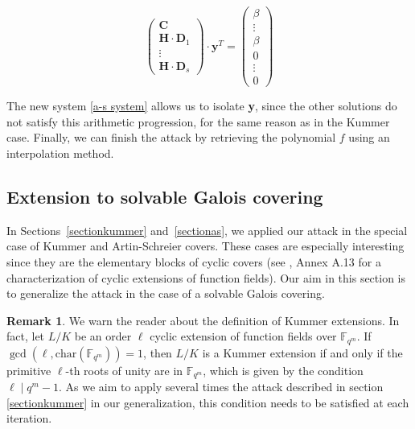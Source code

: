 \documentclass[10pt]{article}
\theoremstyle{definition}
\newtheorem{rq1}[thm]{Remark}
\theoremstyle{definition}
\theoremstyle{definition}
\newcommand{\cd}{\cdot}
\newcommand{\fqm}{\mathbb{F}_{q^m}}
\begin{document}
\begin{equation} \label{a-s system}
\begin{pmatrix}
\mathbf{C}\\
\mathbf{H} \cd \mathbf{D}_1 \\
\vdots \\
\mathbf{H} \cd \mathbf{D}_s
\end{pmatrix}
\cd \mathbf{y}^T = 
\begin{pmatrix}
\beta \\
\vdots \\
\beta \\
0 \\
\vdots \\
0
\end{pmatrix} 
\end{equation}

The new system \eqref{a-s system} allows us to isolate \textbf{y}, since the other solutions do not satisfy this arithmetic progression, for the same reason as in the Kummer case. Finally, we can finish the attack by retrieving the polynomial $f$ using an interpolation method. 

\subsection{Extension to solvable Galois covering} \label{solvable}

In Sections~\ref{sectionkummer} and~\ref{sectionas}, we applied our attack in the special case of Kummer and Artin-Schreier covers. These cases are especially interesting since they are the elementary blocks of cyclic covers (see \cite{Sti}, Annex A.13 for a characterization of cyclic extensions of function fields). Our aim in this section is to generalize the attack in the case of a solvable Galois covering.

\begin{rq1} \label{racinesdel'unite}
We warn the reader about the definition of Kummer extensions. In fact, let $L/K$ be an order $\ell$ cyclic extension of function fields over $\fqm$. If $\gcd(\ell,\mathrm{char}(\fqm))=1$, then $L/K$ is a Kummer extension if and only if the primitive $\ell$-th roots of unity are in $\fqm$, which is given by the condition $\ell \mid q^m-1$. As we aim to apply several times the attack described in section \ref{sectionkummer} in our generalization, this condition needs to be satisfied at each iteration.
\end{rq1}
\end{document}
